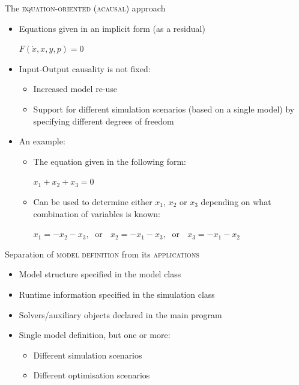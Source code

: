 \documentclass[compress,newPxFont,sthlmFooter]{beamer}
\begin{document}
\begin{frame}{The \textsc{equation-oriented} (\textsc{acausal}) approach}
\begin{itemize}
  \item \alert{Equations given in an implicit form} (as a residual)
    \begin{center}
      $F(\dot {x}, x, y, p) = 0$
    \end{center}
  \item \alert{Input-Output causality} is \alert{not fixed}:
    \begin{itemize}
        \item Increased model re-use
        \item Support for \alert{different simulation scenarios} (based on a single model) by specifying different degrees of freedom
    \end{itemize}
  \item An example:
    \begin{itemize}
        \item The equation given in the following form:
            \begin{center}
                $x_1 + x_2 + x_3 = 0$
            \end{center}
        \item Can be used to determine either $x_1$, $x_2$ or $x_3$ depending on what combination of variables is known:
            \begin{center}
                $x_1 = -x_2 - x_3, \;$ \alert{or}  $\;$
                $x_2 = -x_1 - x_3, \;$ \alert{or}  $\;$
                $x_3 = -x_1 - x_2$
            \end{center}
    \end{itemize}
\end{itemize}
\end{frame}

\begin{frame}{Separation of \textsc{model definition} from its \textsc{applications}}
\begin{itemize}
  \item \alert{Model structure} specified in the \alert{model class}
  \item \alert{Runtime information} specified in the \alert{simulation class}
  \item \alert{Solvers/auxiliary objects} declared in the \alert{main program}
  \item \alert{Single model definition}, but \alert{one or more}:
  \begin{itemize}
    \item Different \alert{simulation scenarios}
    \item Different \alert{optimisation scenarios}
  \end{itemize}
\end{itemize}
\end{frame}
\end{document}
